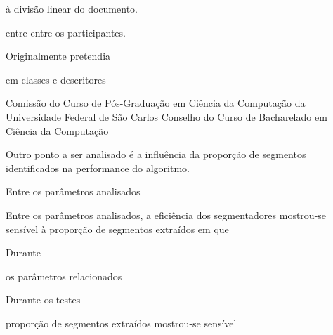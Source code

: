 
à divisão linear do documento.  

entre entre os participantes. 







Originalmente pretendia 



em classes e descritores 



Comissão do Curso de Pós-Graduação em Ciência da Computação da Universidade Federal de São Carlos 
Conselho do Curso de Bacharelado em Ciência da Computação










Outro ponto a ser analisado é a influência da proporção de segmentos identificados na performance do algoritmo. 

Entre os parâmetros analisados

Entre os parâmetros analisados, a eficiência dos segmentadores mostrou-se sensível à proporção de segmentos extraídos em que 

Durante








os parâmetros relacionados 



Durante os testes 



proporção de segmentos extraídos mostrou-se sensível































